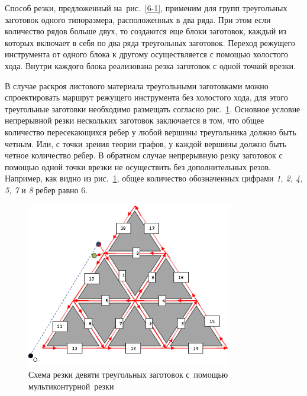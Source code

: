 \documentclass[11pt,twoside,openany]{report}
\begin{document}
Способ резки, предложенный
на~рис.~\ref{6-1},
применим для групп треугольных заготовок одного типоразмера,
расположенных в два ряда.
При этом если количество рядов больше двух,
то создаются еще блоки заготовок,
каждый из которых включает в себя по два ряда треугольных заготовок.
Переход режущего инструмента от одного блока к другому
осуществляется с помощью холостого хода.
Внутри каждого блока реализована резка заготовок с одной точкой врезки.

В случае раскроя листового материала треугольными
заготовками можно спроектировать маршрут режущего
инструмента без холостого хода,
для этого треугольные заготовки необходимо
размещать согласно рис.~\ref{3-10}.
Основное условие непрерывной резки нескольких
заготовок заключается в том,
что общее количество пересекающихся ребер у
любой вершины треугольника должно быть четным.
Или, с точки зрения теории графов,
у каждой вершины
должно быть четное количество ребер.
В обратном случае непрерывную резку заготовок
с помощью одной точки врезки не осуществить
без дополнительных резов.
Например, как видно из рис.~\ref{3-10},
общее количество обозначенных цифрами
{\it 1, 2, 4, 5, 7} и {\it 8} ребер равно 6.

\begin{figure}[h]
  \begin{center}
  \includegraphics[width=0.8\textwidth]{3-10.png}
  \caption{
    Схема резки девяти треугольных заготовок
    с~помощью мультиконтурной~резки}
  \label{3-10}
  \end{center}
\end{figure}
\end{document}
